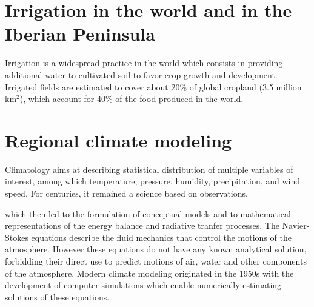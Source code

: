 \section{Irrigation in the world and in the Iberian Peninsula}
Irrigation is a widespread practice in the world which consists in providing additional water to cultivated soil to favor crop growth and development.
Irrigated fields are estimated to cover about 20\% of global cropland (3.5 million km$^2$), which account for 40\% of the food produced in the world.



\section{Regional climate modeling}
Climatology aims at describing statistical distribution of multiple variables of interest, among which temperature, pressure, humidity, precipitation, and wind speed.
For centuries, it remained a science based on observations, 

which then led to the formulation of conceptual models and to mathematical representations of the energy balance and radiative tranfer processes.
The Navier-Stokes equations describe the fluid mechanics that control the motions of the atmosphere. However these equations do not have any known analytical solution, forbidding their direct use to predict motions of air, water and other components of the atmosphere. 
Modern climate modeling originated in the 1950s with the development of computer simulations which enable numerically estimating solutions of these equations.

